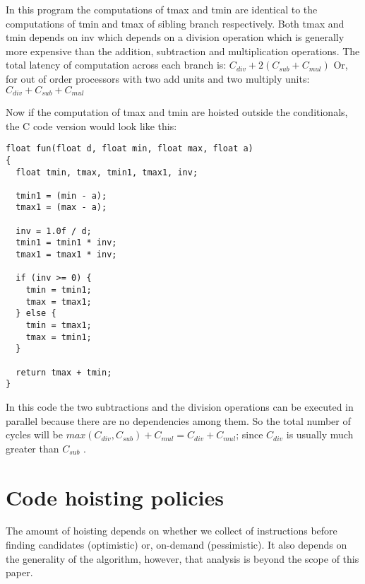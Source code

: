 \documentclass{sig-alternate}
\begin{document}
In this program the computations of tmax and tmin are identical to the
computations of tmin and tmax of sibling branch respectively. Both tmax and tmin
depends on inv which depends on a division operation which is generally more
expensive than the addition, subtraction and multiplication operations. The
total latency of computation across each branch is:
$C_{div} + 2(C_{sub} + C_{mul})$
Or, for out of order processors with two add units and two multiply units:
$C_{div} + C_{sub} + C_{mul}$

Now if the computation of tmax and tmin are hoisted outside the
conditionals, the C code version would look like this:
\begin{verbatim}
float fun(float d, float min, float max, float a)
{
  float tmin, tmax, tmin1, tmax1, inv;

  tmin1 = (min - a);
  tmax1 = (max - a);

  inv = 1.0f / d;
  tmin1 = tmin1 * inv;
  tmax1 = tmax1 * inv;

  if (inv >= 0) {
    tmin = tmin1;
    tmax = tmax1;
  } else {
    tmin = tmax1;
    tmax = tmin1;
  }

  return tmax + tmin;
}

\end{verbatim}

In this code the two subtractions and the division operations can be executed in
parallel because there are no dependencies among them. So the total number of
cycles will be $max(C_{div}, C_{sub}) + C_{mul} = C_{div} + C_{mul}$; since $C_{div}$ is
usually much greater than $C_{sub}$ \cite{x86,aarch64}.


\newpage

\section{Code hoisting policies}
The amount of hoisting depends on whether we collect \GVN{} of instructions
before finding candidates (optimistic) or, on-demand (pessimistic). It also
depends on the generality of the \GVN{} algorithm, however, that analysis is beyond
the scope of this paper.
\end{document}
